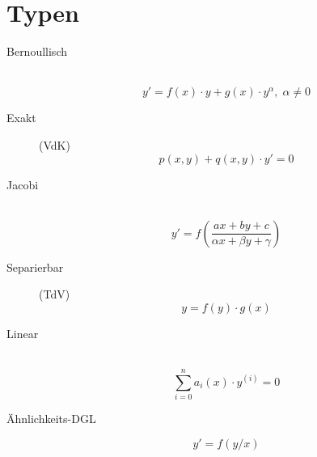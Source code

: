 





\section{Typen}

\begin{description}
  \item [{Bernoullisch}]~
	\[ y' = f(x) \cdot y + g(x) \cdot y^\alpha,\; \alpha \neq 0 \]
  \item [{Exakt}] (VdK)
	\[ p(x,y) + q(x,y) \cdot y' = 0 \]
  \item [{Jacobi}]~
	\[ y' = f\left( \frac{ax+by+c}{\alpha x + \beta y + \gamma} \right) \]
  \item [{Separierbar}] (TdV)
	\[ y = f(y) \cdot g(x) \]
  \item [{Linear}]~
	\[ \sum_{i=0}^n a_i(x)\cdot y^{(i)} = 0 \]
  \item [Ähnlichkeits-DGL]
	\[ y' = f(y/x) \]
\end{description}
